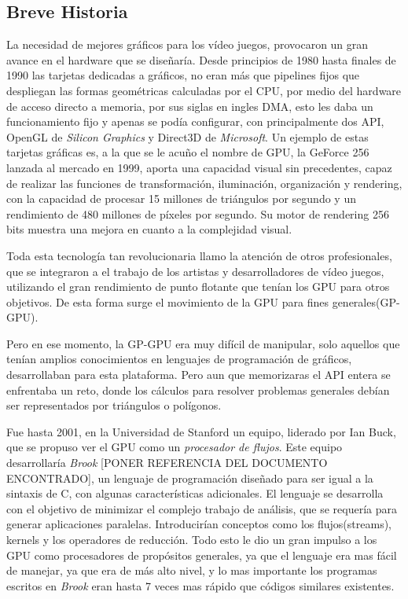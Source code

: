 \subsection{Breve Historia}
La necesidad de mejores gráficos para los vídeo juegos, provocaron un gran avance en el hardware que se diseñaría. Desde principios de 1980 hasta finales de 1990 las tarjetas dedicadas a gráficos, no eran más que pipelines fijos que despliegan las formas geométricas calculadas por el CPU, por medio del hardware de acceso directo a memoria, por sus siglas en ingles DMA, esto les daba un funcionamiento fijo y apenas se podía configurar, con principalmente dos API, OpenGL de \textit{Silicon Graphics} y Direct3D de \textit{Microsoft}. Un ejemplo de estas tarjetas gráficas es, a la que se le acuño el nombre de GPU, la GeForce 256\cite{GeForce256} lanzada al mercado en 1999, aporta una capacidad visual sin precedentes, capaz de realizar las funciones de  transformación, iluminación, organización y rendering, con la capacidad de procesar 15 millones de triángulos por segundo y un rendimiento de 480 millones de píxeles por segundo. Su motor de rendering  256 bits muestra una mejora en cuanto a la complejidad visual.

Toda esta tecnología tan revolucionaria llamo la atención de otros profesionales, que se integraron a el trabajo de los artistas y desarrolladores de vídeo juegos, utilizando el gran rendimiento de punto flotante que tenían los GPU para otros objetivos. De esta forma surge el movimiento de la GPU para fines generales(GP-GPU).

Pero en ese momento, la GP-GPU era muy difícil de manipular, solo aquellos que tenían amplios conocimientos en lenguajes de programación de gráficos, desarrollaban para esta plataforma. Pero aun que memorizaras el API entera se enfrentaba un reto, donde los cálculos para resolver problemas generales debían ser representados por triángulos o polígonos.

Fue hasta 2001, en la Universidad de Stanford un equipo, liderado por Ian Buck, que se propuso ver el GPU como un  \textit{procesador de flujos}. Este equipo desarrollaría \textit{Brook} [PONER REFERENCIA DEL DOCUMENTO ENCONTRADO], un lenguaje de programación diseñado para ser igual a la sintaxis de C, con algunas características adicionales. El lenguaje se desarrolla con el objetivo de minimizar el complejo trabajo de análisis, que se requería para generar aplicaciones paralelas. Introducirían conceptos como los flujos(streams), kernels y los operadores de reducción. Todo esto le dio un gran impulso a los GPU como procesadores de propósitos generales, ya que el lenguaje era mas fácil de manejar, ya que era de más alto nivel, y lo mas importante los programas escritos en \textit{Brook} eran hasta 7 veces mas rápido que códigos similares existentes.


